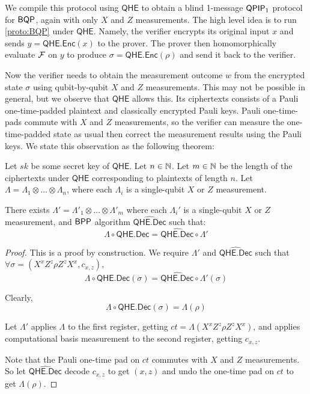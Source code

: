 We compile this protocol using $\mathsf{QHE}$ to obtain a blind 1-message $\operatorname{\mathsf{QPIP}}_1$ protocol for $\operatorname{\mathsf{BQP}}$, again with only $X$ and $Z$ measurements.
The high level idea is to run \cref{proto:BQP} under $\mathsf{QHE}$.
Namely, the verifier encrypts its original input $x$ and sends $y=\mathsf{QHE.Enc}(x)$ to the prover.
The prover then homomorphically evaluate $\mathcal{F}$ on $y$ to produce $\sigma=\mathsf{QHE.Enc}(\rho)$  and send it back to the verifier.

Now the verifier needs to obtain the measurement outcome $w$ from the encrypted state $\sigma$ using qubit-by-qubit $X$ and $Z$ measurements.
This may not be possible in general, but we observe that $\mathsf{QHE}$ allows this. 
Its ciphertexts consists of a Pauli one-time-padded plaintext and classically encrypted Pauli keys.
Pauli one-time-pads commute with $X$ and $Z$ measurements, so the verifier can measure the one-time-padded state as usual then correct the measurement results using the Pauli keys.
We state this observation as the following theorem:

\begin{thm}
	\label{decodeMeasureOrder}
	Let $sk$ be some secret key of $\mathsf{QHE}$.
	Let $n\in\mathbb{N}$.
	Let $m\in\mathbb{N}$ be the length of the ciphertexts under $\mathsf{QHE}$ corresponding to plaintexts of length $n$.
	Let $\Lambda=\Lambda_1\otimes\ldots\otimes\Lambda_n$, where each $\Lambda_i$ is a single-qubit $X$ or $Z$ measurement.

	There exists $\Lambda'=\Lambda'_1\otimes\ldots\otimes\Lambda'_m$ where each $\Lambda_i'$ is a single-qubit $X$ or $Z$ measurement, and $\operatorname{\mathsf{BPP}}$ algorithm $\widehat{\mathsf{QHE.Dec}}$ such that:
	$$\Lambda\circ\mathsf{QHE.Dec}=\widehat{\mathsf{QHE.Dec}}\circ\Lambda'$$
\end{thm}
\begin{proof}
	This is a proof by construction.
	We require $\Lambda'$ and $\widehat{\mathsf{QHE.Dec}}$ such that $\forall\sigma=(X^xZ^z\rho Z^zX^x, c_{x,z})$,
	$$\Lambda\circ\mathsf{QHE.Dec}(\sigma)=\widehat{\mathsf{QHE.Dec}}\circ\Lambda'(\sigma)$$

	Clearly,
	$$\Lambda\circ\mathsf{QHE.Dec}(\sigma)=\Lambda(\rho)$$
	
	Let $\Lambda'$ applies $\Lambda$ to the first register, getting $ct=\Lambda(X^xZ^z\rho Z^zX^x)$, and applies computational basis measurement to the second register, getting $c_{x, z}$.

	Note that the Pauli one-time pad on $ct$ commutes with $X$ and $Z$ measurements.
	So let $\widehat{\mathsf{QHE.Dec}}$ decode $c_{x, z}$ to get $(x, z)$ and undo the one-time pad on $ct$ to get $\Lambda(\rho)$.
\end{proof}

